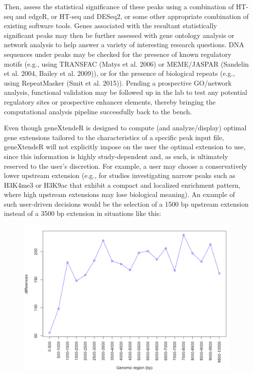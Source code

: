 \documentclass[12pt]{article}
\begin{document}
Then, assess the statistical significance of these peaks using a combination of HT-seq and edgeR, or HT-seq and DESeq2, or some other appropriate combination of existing software tools.  Genes associated with the resultant statistically significant peaks may then be further assessed with gene ontology analysis or network analysis to help answer a variety of interesting research questions.  DNA sequences under peaks may be checked for the presence of known regulatory motifs (e.g., using TRANSFAC (Matys et al. 2006) or MEME/JASPAR (Sandelin et al. 2004, Bailey et al. 2009)), or for the presence of biological repeats (e.g., using RepeatMasker (Smit et al. 2015)). Pending a prospective GO/network analysis, functional validation may be followed up in the lab to test any potential regulatory sites or prospective enhancer elements, thereby bringing the computational analysis pipeline successfully back to the bench.  

Even though geneXtendeR is designed to compute (and analyze/display) optimal gene extensions tailored to the characteristics of a specific peak input file, geneXtendeR will not explicitly impose on the user the optimal extension to use, since this information is highly study-dependent and, as such, is ultimately reserved to the user's discretion.  For example, a user may choose a conservatively lower upstream extension (e.g., for studies investigating narrow peaks such as H3K4me3 or H3K9ac that exhibit a compact and localized enrichment pattern, where high upstream extensions may lose biological meaning).  An example of such user-driven decisions would be the selection of a 1500 bp upstream extension instead of a 3500 bp extension in situations like this:

\begin{figure}[H]
\centering
\includegraphics{figures/fig2.png}
\end{figure}
\end{document}
